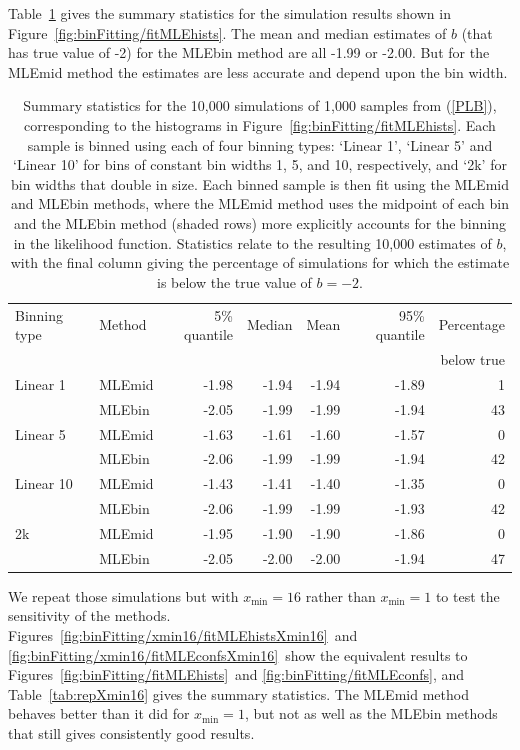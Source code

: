 \documentclass[12pt, letter]{article}
\newcommand{\xmin}{x_{\mathrm{min}}}
\newcommand{\fitMLEhists}{\ref{fig:binFitting/fitMLEhists}}
\newcommand{\fitMLEconfs}{\ref{fig:binFitting/fitMLEconfs}}
\newcommand{\fitMLEhistsXminSixteen}{\ref{fig:binFitting/xmin16/fitMLEhistsXmin16}}
\newcommand{\fitMLEconfsXminSixteen}{\ref{fig:binFitting/xmin16/fitMLEconfsXmin16}}
\begin{document}
Table~\ref{tab:rep} gives the summary statistics for the simulation results
shown in Figure~\fitMLEhists. The mean and median estimates of $b$
(that has true value of -2) for the MLEbin method are all -1.99 or -2.00. But
for the MLEmid method the estimates are less accurate and depend upon the bin
width.
\begin{table}[b]
\caption{\label{tab:rep} Summary statistics for the 10,000 simulations of 1,000
  samples from (\ref{PLB}), corresponding to the histograms in
  Figure~\fitMLEhists. Each sample is binned using each of four binning types:
  `Linear 1', `Linear 5' and `Linear 10' for bins of constant bin widths 1, 5,
  and 10, respectively, and `2k' for bin widths that double in size. Each binned
  sample is then fit using the MLEmid and MLEbin methods, where the MLEmid
  method uses the midpoint of each bin and the MLEbin method (shaded rows)
  more explicitly
  accounts for the binning in the likelihood function. Statistics relate to the
  resulting 10,000 estimates of $b$, with the final column giving the percentage
  of simulations for which the estimate is below the true value of $b = -2$.}
\begin{tabular}{llrrrrr}
\hline Binning type & Method & 5\% quantile & Median & Mean & 95\% quantile &
Percentage\\ & & & & & & below true\\ \hline Linear 1 & MLEmid & -1.98 & -1.94 &
-1.94 & -1.89 & 1\\ & MLEbin & -2.05 & -1.99 & -1.99 & -1.94 & 43 \\ Linear 5 &
MLEmid & -1.63 & -1.61 & -1.60 & -1.57 & 0 \\ & MLEbin & -2.06 & -1.99 & -1.99 &
-1.94 & 42 \\ Linear 10 & MLEmid & -1.43 & -1.41 & -1.40 & -1.35 & 0 \\ & MLEbin
& -2.06 & -1.99 & -1.99 & -1.93 & 42 \\ 2k & MLEmid & -1.95 & -1.90 & -1.90 &
-1.86 & 0 \\ & MLEbin & -2.05 & -2.00 & -2.00 & -1.94 & 47\\ \hline
\end{tabular}
\end{table}

We repeat those simulations but with $\xmin = 16$ rather than $\xmin=1$ to
test the sensitivity of the methods.
Figures~\fitMLEhistsXminSixteen~and \fitMLEconfsXminSixteen~show the equivalent
results to Figures~\fitMLEhists~and \fitMLEconfs, and Table~\ref{tab:repXmin16}
gives the summary statistics. The MLEmid method behaves better than it did
for $\xmin=1$, but not as well as the MLEbin methods that still gives
consistently good results.
\end{document}
